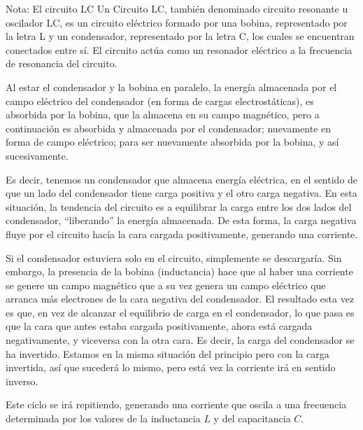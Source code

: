 \begin{mybox_blue}{Nota: El circuito LC}
Un Circuito LC, también denominado circuito resonante u oscilador LC, es un circuito eléctrico formado por una bobina, representado por la letra L y un condensador, representado por la letra C, los cuales se encuentran conectados entre sí. El circuito actúa como un resonador eléctrico a la frecuencia de resonancia del circuito.
\vspace{0.3cm}

Al estar el condensador y la bobina en paralelo, la energía almacenada por el campo eléctrico del condensador (en forma de cargas electrostáticas), es absorbida por la bobina, que la almacena en su campo magnético, pero a continuación es absorbida y almacenada por el condensador; nuevamente en forma de campo eléctrico; para ser nuevamente absorbida por la bobina, y así sucesivamente.
\vspace{0.3cm}

Es decir, tenemos un condensador que almacena energía eléctrica, en el sentido de que un lado del condensador tiene carga positiva y el otro carga negativa. En esta situación, la tendencia del circuito es a equilibrar la carga entre los dos lados del condensador, ``liberando'' la energía almacenada. De esta forma, la carga negativa fluye por el circuito hacía la cara cargada positivamente, generando una corriente. 
\vspace{0.3cm}

Si el condensador estuviera solo en el circuito, simplemente se descargaría. Sin embargo, la presencia de la bobina (inductancia) hace que al haber una corriente se genere un campo magnético que a su vez genera un campo eléctrico que arranca más electrones de la cara negativa del condensador. El resultado esta vez es que, en vez de alcanzar el equilibrio de carga en el condensador, lo que pasa es que la cara que antes estaba cargada positivamente, ahora está cargada negativamente, y viceversa con la otra cara. Es decir, la carga del condensador se ha invertido. Estamos en la misma situación del principio pero con la carga invertida, así que sucederá lo mismo, pero está vez la corriente irá en sentido inverso.
\vspace{0.3cm}

Este ciclo se irá repitiendo, generando una corriente que oscila a una frecuencia determinada por los valores de la inductancia $L$ y del capacitancia $C$.
\end{mybox_blue}

 

